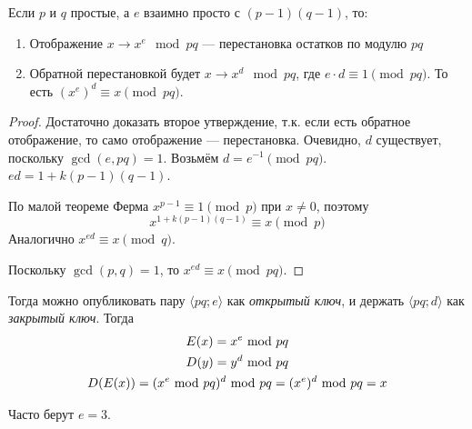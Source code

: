\begin{theorem}
    Если $p$ и $q$ простые, а $e$ взаимно просто
    с $(p - 1) (q - 1)$, то:
    \begin{enumerate}
        \item Отображение $x \to x^e \mod pq$
        --- перестановка остатков по модулю $pq$
        \item Обратной перестановкой будет $x \to x^d \mod pq$,
        где $e \cdot d \equiv 1 \pmod{pq}$.
        То есть $(x^e)^d \equiv x \pmod{pq}$.
    \end{enumerate}
\end{theorem}
\begin{proof}
    Достаточно доказать второе утверждение,
    т.к. если есть обратное отображение, то само отображение --- перестановка.
    Очевидно, $d$ существует, поскольку $\gcd(e, pq) = 1$.
    Возьмём $d = e^{-1} \pmod{pq}$.
    $ed = 1 + k(p - 1)(q - 1)$.

    По малой теореме Ферма
    $x^{p - 1} \equiv 1 \pmod p$ при $x \ne 0$, поэтому
    \[ x^{1 + k(p - 1)(q - 1)} \equiv x \pmod p \]
    Аналогично $x^{ed} \equiv x \pmod q$.

    Поскольку $\gcd(p, q) = 1$,
    то $x^{ed} \equiv x \pmod{pq}$.
\end{proof}

Тогда можно опубликовать пару $\langle pq; e \rangle$
как \emph{открытый ключ}, и держать $\langle pq; d \rangle$
как \emph{закрытый ключ}.
Тогда
\begin{gather*}
    E(x) = x^e ~\text{mod}~ pq \\
    D(y) = y^d ~\text{mod}~ pq \\
    D(E(x)) = (x^e ~\text{mod}~ pq)^d ~\text{mod}~ pq = (x^e)^d ~\text{mod}~ pq = x
\end{gather*}

Часто берут $e = 3$.
